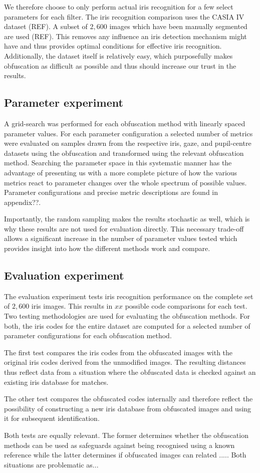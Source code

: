 We therefore choose to only perform actual iris recognition for a few select parameters for each filter. The iris recognition comparison uses the CASIA IV dataset (REF). A subset of $2,600$ images which have been manually segmented are used (REF). This removes any influence an iris detection mechanism might have and thus provides optimal conditions for effective iris recognition. Additionally, the dataset itself is relatively easy, which purposefully makes obfuscation as difficult as possible and thus should increase our trust in the results.





\subsection{Parameter experiment}
A grid-search was performed for each obfuscation method with linearly spaced parameter values. For each parameter configuration a selected number of metrics were evaluated on samples drawn from the respective iris, gaze, and pupil-centre datasets using the obfuscation and transformed using the relevant obfuscation method. Searching the parameter space in this systematic manner has the advantage of presenting us with a more complete picture of how the various metrics react to parameter changes over the whole spectrum of possible values. Parameter configurations and precise metric descriptions are found in appendix??. 

Importantly, the random sampling makes the results stochastic as well, which is why these results are not used for evaluation directly. This necessary trade-off allows a significant increase in the number of parameter values tested which provides insight into how the different methods work and compare.

\subsection{Evaluation experiment}
The evaluation experiment tests iris recognition performance on the complete set of $2,600$ iris images. This results in $xx$ possible code comparisons for each test. Two testing methodologies are used for evaluating the obfuscation methods. For both, the iris codes for the entire dataset are computed for a selected number of parameter configurations for each obfuscation method.

The first test compares the iris codes from the obfuscated images with the original iris codes derived from the unmodified images. The resulting distances thus reflect data from a situation where the obfuscated data is checked against an existing iris database for matches. 

The other test compares the obfuscated codes internally and therefore reflect the possibility of constructing a new iris database from obfuscated images and using it for subsequent identification. 

Both tests are equally relevant. The former determines whether the obfuscation methods can be used as safeguards against being recognised using a known reference while the latter determines if obfuscated images can related ..... Both situations are problematic as...
